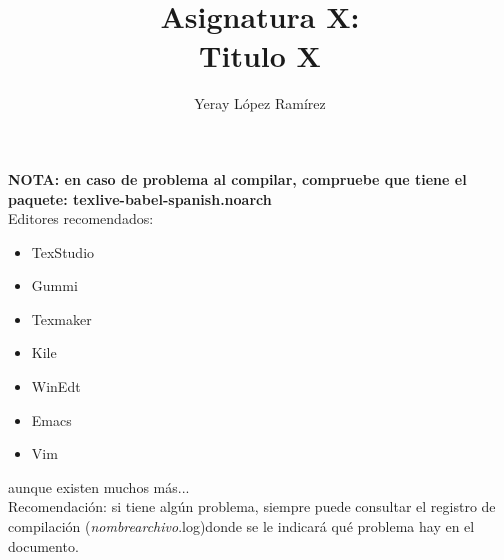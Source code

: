 

\title{Asignatura X:\\
	Titulo X  \hspace{0.05cm} }   

\author{Yeray López Ramírez	}                             

\renewcommand*\contentsname{hola}

\makeatletter
\let\thetitle\@title
\let\theauthor\@author
\let\thedate\@date
\makeatother





\newpage %
\newcommand{\code}[1]{\colorbox{light-gray}{\textcolor{alizarin}{\texttt{#1}}}}
\newcommand{\high}[1]{\colorbox{light-gray}{\textcolor{nyellow}{\texttt{#1}}}}

\tableofcontents %

\listoffigures

\listoftables

\newpage

\textbf{NOTA: en caso de problema al compilar, compruebe que tiene el paquete: texlive-babel-spanish.noarch }  \\

Editores recomendados:
\begin{itemize}
	\item TexStudio 
	\item Gummi 
	\item Texmaker 
	\item Kile 
	\item WinEdt 
	\item Emacs 
	\item Vim 
\end{itemize}

aunque existen muchos más...\\

Recomendación: si tiene algún problema, siempre puede consultar el registro de compilación (\textit{nombrearchivo}.log)donde se le indicará qué problema hay en el documento.

